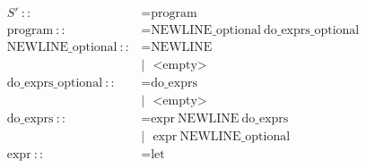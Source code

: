 \documentclass{article}
\begin{document}
\allowdisplaybreaks
\begin{align*}
  S'\ ::                              & = \text{program}                                                                                                                                                                                                          \\
  \text{program}\ ::                  & = \text{NEWLINE\_optional}\ \text{do\_exprs\_optional}                                                                                                                                                                    \\
  \text{NEWLINE\_optional}\ ::        & = \text{NEWLINE}                                                                                                                                                                                                          \\
                                      & |\ \ \ \text{<empty>}                                                                                                                                                                                                     \\
  \text{do\_exprs\_optional}\ ::      & = \text{do\_exprs}                                                                                                                                                                                                        \\
                                      & |\ \ \ \text{<empty>}                                                                                                                                                                                                     \\
  \text{do\_exprs}\ ::                & = \text{expr}\ \text{NEWLINE}\ \text{do\_exprs}                                                                                                                                                                           \\
                                      & |\ \ \ \text{expr}\ \text{NEWLINE\_optional}                                                                                                                                                                              \\
  \text{expr}\ ::                     & = \text{let}                                                                                                                                                                                                              \\

\end{align*}
\end{document}
